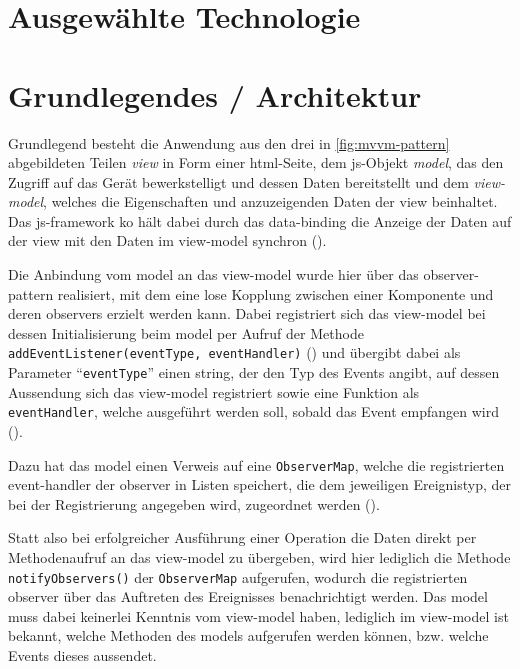 \section{Ausgewählte Technologie} 

\section{Grundlegendes / Architektur}
	
Grundlegend besteht die Anwendung aus den drei in \autoref{fig:mvvm-pattern} abgebildeten Teilen \emph{\gls{view}} in Form einer \gls{html}-Seite, dem \gls{js}-Objekt \emph{\gls{model}}, das den Zugriff auf das Gerät bewerkstelligt und dessen Daten bereitstellt und dem \emph{\gls{view-model}}, welches die Eigenschaften und anzuzeigenden Daten der \gls{view} beinhaltet.
Das \gls{js}-\gls{framework} \gls{ko} hält dabei durch das \gls{data-binding} die Anzeige der Daten auf der \gls{view} mit den Daten im \gls{view-model} synchron ().

Die Anbindung vom \gls{model} an das \gls{view-model} wurde hier über das \gls{observer-pattern} realisiert, mit dem eine lose Kopplung zwischen einer Komponente und deren \glspl{observer} erzielt werden kann.
Dabei registriert sich das \gls{view-model} bei dessen Initialisierung beim \gls{model} per Aufruf der Methode \lstinline|addEventListener(eventType, eventHandler)| () und übergibt dabei als Parameter \enquote{\lstinline|eventType|} einen \gls{string}, der den Typ des Events angibt, auf dessen Aussendung sich das \gls{view-model} registriert sowie eine Funktion als \lstinline|eventHandler|, welche ausgeführt werden soll, sobald das Event empfangen wird ().

Dazu hat das \gls{model} einen Verweis auf eine \lstinline|ObserverMap|, welche die registrierten \gls{event-handler} der \gls{observer} in Listen speichert, die dem jeweiligen Ereignistyp, der bei der Registrierung angegeben wird, zugeordnet werden ().

Statt also bei erfolgreicher Ausführung einer Operation die Daten direkt per Methodenaufruf an das \gls{view-model} zu übergeben, wird hier lediglich die Methode \lstinline|notifyObservers()| der \lstinline|ObserverMap| aufgerufen, wodurch die registrierten \gls{observer} über das Auftreten des Ereignisses benachrichtigt werden.
Das \gls{model} muss dabei keinerlei Kenntnis vom \gls{view-model} haben, lediglich im \gls{view-model} ist bekannt, welche Methoden des \glspl{model} aufgerufen werden können, bzw. welche Events dieses aussendet.

